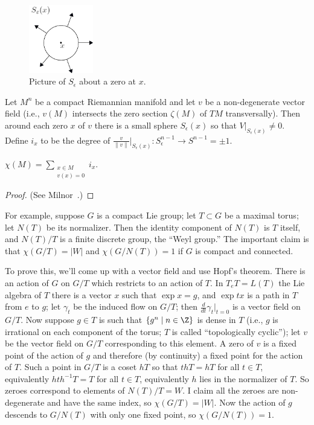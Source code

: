 \begin{figure}
\centering\includegraphics[width=0.25\textwidth]{figures/figure39.pdf}
\caption{\small Picture of $S_\epsilon$ about a zero at $x$.}
\end{figure}
Let $M^n$ be a compact Riemannian manifold and let $v$ be a non-degenerate vector field (i.e., $v(M)$ intersects the zero section $\zeta(M)$ of $TM$ transversally).  Then around each zero $x$ of $v$ there is a small sphere $S_\epsilon(x)$ so that $V|_{S_\epsilon(x)} \ne 0$.  Define $i_x$ to be the degree of $\frac{v}{\|v\|}|_{S_\epsilon(x)}: S^{n-1}_\epsilon \to S^{n-1} = \pm 1$.
\begin{thm}[Hopf]
$\chi(M) = \sum_{\substack{x \in M \\ v(x) = 0}} i_x$.
\end{thm}
\begin{proof}
(See Milnor~\cite{Milnor}.)
\end{proof}
For example, suppose $G$ is a compact Lie group; let $T \subset G$ be a maximal torus; let $N(T)$ be its normalizer.  Then the identity component of $N(T)$ is $T$ itself, and $N(T) / T$ is a finite discrete group, the ``Weyl group.''  The important claim is that $\chi(G / T) = |W|$ and $\chi(G / N(T)) = 1$ if $G$ is compact and connected.

To prove this, we'll come up with a vector field and use Hopf's theorem.  There is an action of $G$ on $G/T$ which restricts to an action of $T$.  In $T_eT = L(T)$ the Lie algebra of $T$ there is a vector $x$ such that $\exp x = g$, and $\exp tx$ is a path in $T$ from $e$ to $g$; let $\gamma_t$ be the induced flow on $G/T$; then $\frac{d}{dt} \gamma_t |_{t = 0}$ is a vector field on $G/T$.  Now suppose $g \in T$ is such that $\{g^n \mid n \in \Z\}$ is dense in $T$ (i.e., $g$ is irrational on each component of the torus; $T$ is called ``topologically cyclic''); let $v$ be the vector field on $G/T$ corresponding to this element.  A zero of $v$ is a fixed point of the action of $g$ and therefore (by continuity) a fixed point for the action of $T$.  Such a point in $G/T$ is a coset $hT$ so that $thT = hT$ for all $t \in T$, equivalently $hth^{-1} T = T$ for all $t \in T$, equivalently $h$ lies in the normalizer of $T$.  So zeroes correspond to elements of $N(T) / T = W$.  I claim all the zeroes are non-degenerate and have the same index, so $\chi(G/T) = |W|$.  Now the action of $g$ descends to $G/N(T)$ with only one fixed point, so $\chi(G/N(T)) = 1$.

